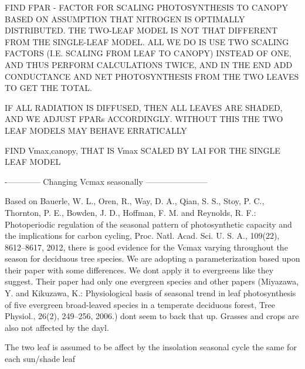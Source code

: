 F\+I\+N\+D F\+P\+A\+R -\/ F\+A\+C\+T\+O\+R F\+O\+R S\+C\+A\+L\+I\+N\+G P\+H\+O\+T\+O\+S\+Y\+N\+T\+H\+E\+S\+I\+S T\+O C\+A\+N\+O\+P\+Y B\+A\+S\+E\+D O\+N A\+S\+S\+U\+M\+P\+T\+I\+O\+N T\+H\+A\+T N\+I\+T\+R\+O\+G\+E\+N I\+S O\+P\+T\+I\+M\+A\+L\+L\+Y D\+I\+S\+T\+R\+I\+B\+U\+T\+E\+D. T\+H\+E T\+W\+O-\/\+L\+E\+A\+F M\+O\+D\+E\+L I\+S N\+O\+T T\+H\+A\+T D\+I\+F\+F\+E\+R\+E\+N\+T F\+R\+O\+M T\+H\+E S\+I\+N\+G\+L\+E-\/\+L\+E\+A\+F M\+O\+D\+E\+L. A\+L\+L W\+E D\+O I\+S U\+S\+E T\+W\+O S\+C\+A\+L\+I\+N\+G F\+A\+C\+T\+O\+R\+S (I.\+E. S\+C\+A\+L\+I\+N\+G F\+R\+O\+M L\+E\+A\+F T\+O C\+A\+N\+O\+P\+Y) I\+N\+S\+T\+E\+A\+D O\+F O\+N\+E, A\+N\+D T\+H\+U\+S P\+E\+R\+F\+O\+R\+M C\+A\+L\+C\+U\+L\+A\+T\+I\+O\+N\+S T\+W\+I\+C\+E, A\+N\+D I\+N T\+H\+E E\+N\+D A\+D\+D C\+O\+N\+D\+U\+C\+T\+A\+N\+C\+E A\+N\+D N\+E\+T P\+H\+O\+T\+O\+S\+Y\+N\+T\+H\+E\+S\+I\+S F\+R\+O\+M T\+H\+E T\+W\+O L\+E\+A\+V\+E\+S T\+O G\+E\+T T\+H\+E T\+O\+T\+A\+L.

I\+F A\+L\+L R\+A\+D\+I\+A\+T\+I\+O\+N I\+S D\+I\+F\+F\+U\+S\+E\+D, T\+H\+E\+N A\+L\+L L\+E\+A\+V\+E\+S A\+R\+E S\+H\+A\+D\+E\+D, A\+N\+D W\+E A\+D\+J\+U\+S\+T F\+P\+A\+Rs A\+C\+C\+O\+R\+D\+I\+N\+G\+L\+Y. W\+I\+T\+H\+O\+U\+T T\+H\+I\+S T\+H\+E T\+W\+O L\+E\+A\+F M\+O\+D\+E\+L\+S M\+A\+Y B\+E\+H\+A\+V\+E E\+R\+R\+A\+T\+I\+C\+A\+L\+L\+Y

F\+I\+N\+D Vmax,canopy, T\+H\+A\+T I\+S Vmax S\+C\+A\+L\+E\+D B\+Y L\+A\+I F\+O\+R T\+H\+E S\+I\+N\+G\+L\+E L\+E\+A\+F M\+O\+D\+E\+L

-\/------------ Changing Vcmax seasonally -----------------------

Based on Bauerle, W. L., Oren, R., Way, D. A., Qian, S. S., Stoy, P. C., Thornton, P. E., Bowden, J. D., Hoffman, F. M. and Reynolds, R. F.\+: Photoperiodic regulation of the seasonal pattern of photosynthetic capacity and the implications for carbon cycling, Proc. Natl. Acad. Sci. U. S. A., 109(22), 8612–8617, 2012, there is good evidence for the Vcmax varying throughout the season for deciduous tree species. We are adopting a parameterization based upon their paper with some differences. We don\textquotesingle{}t apply it to evergreens like they suggest. Their paper had only one evergreen species and other papers (Miyazawa, Y. and Kikuzawa, K.\+: Physiological basis of seasonal trend in leaf photosynthesis of five evergreen broad-\/leaved species in a temperate deciduous forest, Tree Physiol., 26(2), 249–256, 2006.) don\textquotesingle{}t seem to back that up. Grasses and crops are also not affected by the dayl.

The two leaf is assumed to be affect by the insolation seasonal cycle the same for each sun/shade leaf

